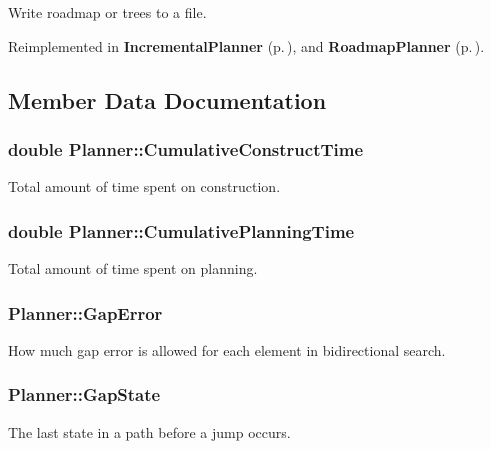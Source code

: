 Write roadmap or trees to a file.



Reimplemented in {\bf Incremental\-Planner} {\rm (p.\,\pageref{class_IncrementalPlanner_a5})}, and {\bf Roadmap\-Planner} {\rm (p.\,\pageref{class_RoadmapPlanner_a2})}.

\subsection{Member Data Documentation}
\subsubsection{\setlength{\rightskip}{0pt plus 5cm}double Planner::Cumulative\-Construct\-Time}\label{class_Planner_m1}


Total amount of time spent on construction.

\subsubsection{\setlength{\rightskip}{0pt plus 5cm}double Planner::Cumulative\-Planning\-Time}\label{class_Planner_m0}


Total amount of time spent on planning.

\subsubsection{ Planner::Gap\-Error}\label{class_Planner_m6}


How much gap error is allowed for each element in bidirectional search.

\subsubsection{ Planner::Gap\-State}\label{class_Planner_m4}


The last state in a path before a jump occurs.

